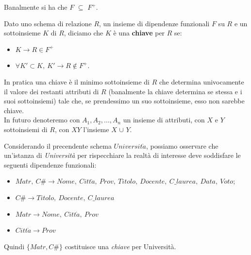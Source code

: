 Banalmente si ha che $F$ $\subseteq$ $F^+$.\\
\label{defn_4_3}
\begin{defn}
 Dato uno schema di relazione $R$, un insieme di dipendenze funzionali $F$ su $R$ e un
sottoinsieme $K$ di $R$, diciamo che $K$ è una \textbf{chiave} per $R$ se:
\begin{itemize}
 \item $K \rightarrow R \in F^+$
 \item $\forall K'\subset K,\ K'\rightarrow R \notin F^+$.
\end{itemize}
\end{defn}
In pratica una chiave è il minimo sottoinsieme di $R$ che determina univocamente il 
valore dei restanti attributi di $R$ (banalmente la chiave determina se stessa e i 
suoi sottoinsiemi) tale che, se prendessimo un suo sottoinsieme, esso non sarebbe 
chiave.\\
In futuro denoteremo con $A_1, A_2, \ldots, A_n$ un insieme di attributi, con $X$ 
e $Y$ sottoinsiemi di $R$, con $XY$ l'insieme $X$ $\cup$ $Y$.

\begin{exmp}
 Considerando il precendente schema $Universit\grave{a}$, possiamo osservare che un'istanza 
 di \emph{Università} per rispecchiare la realtà di interesse deve soddisfare le seguenti 
 dipendenze funzionali:
 \begin{itemize}
  \item $Matr,\ C\# \rightarrow Nome,\ Citt\grave{a},\ Prov,\ Titolo,\ Docente,\ C\_laurea,
  \ Data,\ Voto$;
  \item $C\# \rightarrow Titolo,\ Docente,\ C\_laurea$
  \item $Matr \rightarrow Nome,\ Citt\grave{a},\ Prov$
  \item $Citt\grave{a} \rightarrow Prov$
 \end{itemize}
 Quindi $\{Matr, C\#\}$ costituisce una \emph{chiave} per Università.
\end{exmp}

